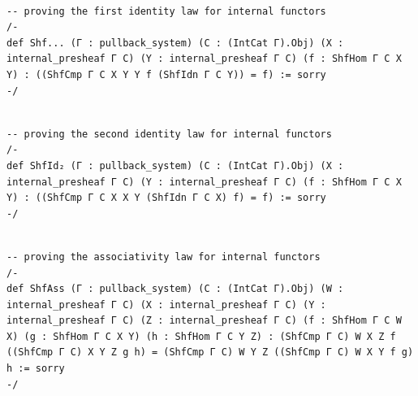 \documentclass{book}
\theoremstyle{definition}
\newcounter{lcounter}
\begin{document}
\begin{center}
\begin{tcolorbox}[width=5in,colback={white},title={\begin{center}\texttt{Lean \thelcounter} \addtocounter{lcounter}{1}  \end{center}},colbacktitle=Blue,coltitle=black]
\begin{verbatim}

-- proving the first identity law for internal functors
/-
def Shf... (Γ : pullback_system) (C : (IntCat Γ).Obj) (X : internal_presheaf Γ C) (Y : internal_presheaf Γ C) (f : ShfHom Γ C X Y) : ((ShfCmp Γ C X Y Y f (ShfIdn Γ C Y)) = f) := sorry
-/

\end{verbatim}
\end{tcolorbox}
\end{center}

\begin{center}
\begin{tcolorbox}[width=5in,colback={white},title={\begin{center}\texttt{Lean \thelcounter} \addtocounter{lcounter}{1}  \end{center}},colbacktitle=Blue,coltitle=black]
\begin{verbatim}

-- proving the second identity law for internal functors
/-
def ShfId₂ (Γ : pullback_system) (C : (IntCat Γ).Obj) (X : internal_presheaf Γ C) (Y : internal_presheaf Γ C) (f : ShfHom Γ C X Y) : ((ShfCmp Γ C X X Y (ShfIdn Γ C X) f) = f) := sorry
-/

\end{verbatim}
\end{tcolorbox}
\end{center}

\begin{center}
\begin{tcolorbox}[width=5in,colback={white},title={\begin{center}\texttt{Lean \thelcounter} \addtocounter{lcounter}{1}  \end{center}},colbacktitle=Blue,coltitle=black]
\begin{verbatim}

-- proving the associativity law for internal functors
/-
def ShfAss (Γ : pullback_system) (C : (IntCat Γ).Obj) (W : internal_presheaf Γ C) (X : internal_presheaf Γ C) (Y : internal_presheaf Γ C) (Z : internal_presheaf Γ C) (f : ShfHom Γ C W X) (g : ShfHom Γ C X Y) (h : ShfHom Γ C Y Z) : (ShfCmp Γ C) W X Z f ((ShfCmp Γ C) X Y Z g h) = (ShfCmp Γ C) W Y Z ((ShfCmp Γ C) W X Y f g) h := sorry
-/

\end{verbatim}
\end{tcolorbox}
\end{center}
\end{document}
